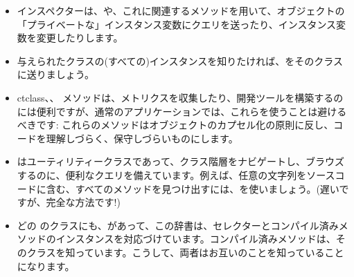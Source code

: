 \documentclass[a4paper,10pt,twoside]{book}
\begin{document}
\begin{itemize}
\item インスペクターは、や、これに関連するメソッドを用いて、オブジェクトの「プライベートな」インスタンス変数にクエリを送ったり、インスタンス変数を変更したりします。
\item 与えられたクラスの(すべての)インスタンスを知りたければ、をそのクラスに送りましょう。
\item ct{class}、、 \etc メソッドは、メトリクスを収集したり、開発ツールを構築するのには便利ですが、通常のアプリケーションでは、これらを使うことは避けるべきです: これらのメソッドはオブジェクトのカプセル化の原則に反し、コードを理解しづらく、保守しづらいものにします。
\item {}はユーティリティークラスであって、クラス階層をナビゲートし、ブラウズするのに、便利なクエリを備えています。例えば、任意の文字列をソースコードに含む、すべてのメソッドを見つけ出すには、を使いましょう。(遅いですが、完全な方法です!) %
\item どの \st{}のクラスにも、があって、この辞書は、セレクターとコンパイル済みメソッドのインスタンスを対応づけています。コンパイル済みメソッドは、そのクラスを知っています。こうして、両者はお互いのことを知っていることになります。

\end{itemize}
\end{document}
